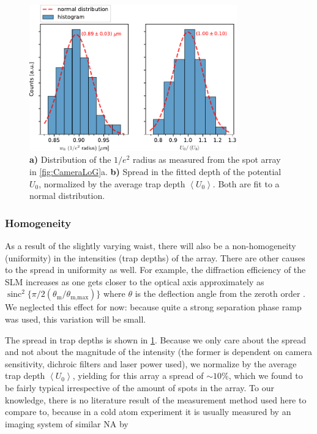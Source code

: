 \begin{figure}
    \centering
    \includegraphics[width=0.8\textwidth]{figures/FittedHistograms.pdf}
    \caption{\textbf{a)} Distribution of the $1/e^2$ radius as measured from the spot array in \cref{fig:CameraLoG}a.
    \textbf{b)} Spread in the fitted depth of the potential $U_0$, normalized by the average trap depth $\left\langle U_0 \right\rangle$.
    Both are fit to a normal distribution.
    }
    \label{fig:Histograms}
\end{figure}

\subsubsection*{Homogeneity}

As a result of the slightly varying waist, there will also be a non-homogeneity (uniformity) in the intensities (trap depths) of the array.
There are other causes to the spread in uniformity as well.
For example, the diffraction efficiency of the SLM increases as one gets closer to the optical axis approximately as $\operatorname{sinc}^2\{
\pi/2 (\theta_{\text{m}}/\theta_{\text{m,max}})\}$ where $\theta$ is the deflection angle from the zeroth order \cite{Ebadi2021}.
We neglected this effect for now: because quite a strong separation phase ramp was used, this variation will be small.

The spread in trap depths is shown in \cref{fig:Histograms}.
Because we only care about the spread and not about the magnitude of the intensity (the former is dependent on camera sensitivity, dichroic filters and laser power used), we normalize by the average trap depth $\left\langle U_0 \right\rangle$, yielding for this array a spread of $\sim 10$\%, which we found to be fairly typical irrespective of the amount of spots in the array.
To our knowledge, there is no literature result of the measurement method used here to compare to, because in a cold atom experiment it is usually measured by an imaging system of similar \ac{NA} by

